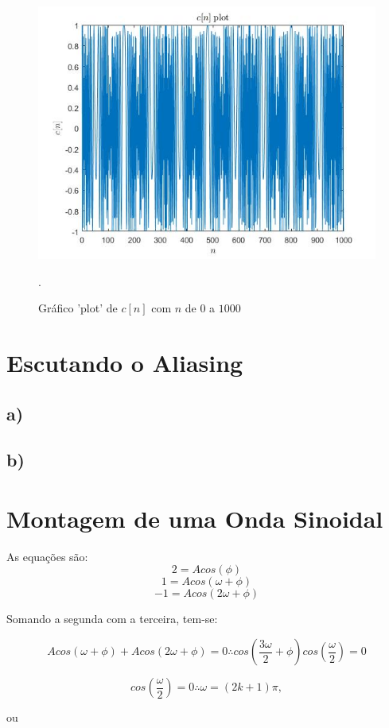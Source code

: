 \documentclass[a4paper, 12pt]{article}
\begin{document}
\begin{figure}[H]
	\centering
	\includegraphics[scale=0.6]{../Imagens/ex2/c.jpg} 
	\caption{Gráfico 'plot' de $c[n]$ com $n$ de $0$ a $1000$}.
	\label{fig:1a}
\end{figure}

\section{Escutando o Aliasing}

\subsection{a)}

\subsection{b)}

\section{Montagem de uma Onda Sinoidal}

As equações são:
$$2=Acos(\phi)$$
$$1=Acos(\omega +\phi)$$
$$-1=Acos(2\omega +\phi)$$

Somando a segunda com a terceira, tem-se:

$$Acos(\omega +\phi) + Acos(2\omega +\phi) = 0 \therefore cos(\frac{3\omega}{2} + \phi)cos(\frac{\omega}{2})=0$$

$$cos(\frac{\omega}{2})=0 \therefore \omega = (2k+1)\pi, $$

ou
\end{document}
